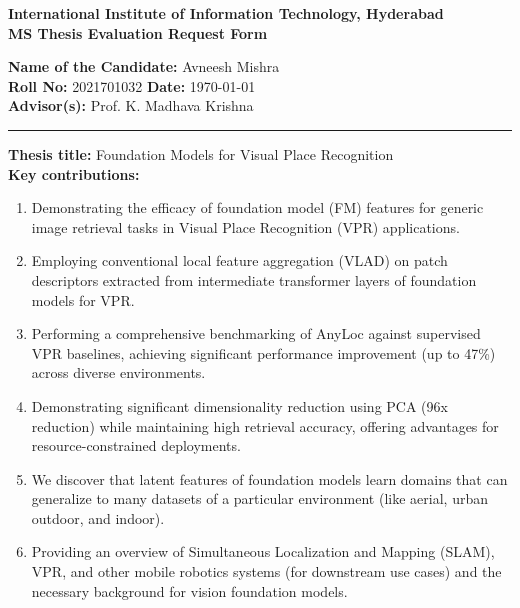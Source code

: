\documentclass[11pt]{article}
\begin{document}
    \begin{center}
        {\Large\bf
        International Institute of Information Technology, Hyderabad
        }\\[2mm]
        {\large\bf
            MS Thesis Evaluation Request Form
        }\\[8mm]
    \end{center}
    {\bf Name of the Candidate:} Avneesh Mishra \\ [2mm]
    {\bf Roll No:} 2021701032
    \hfill {\bf Date:} \today \\ [2mm]
    {\bf Advisor(s):} Prof. K. Madhava Krishna
    \vspace{6mm}
    \hrule
    \vspace{3mm}
    {\bf Thesis title:}
        {Foundation Models for Visual Place Recognition} \\ [4mm]
    {\bf Key contributions:}
    \begin{enumerate}
        \setlength{\itemsep}{0mm}
        \item Demonstrating the efficacy of foundation model (FM)
            features for generic image retrieval tasks in Visual Place
            Recognition (VPR) applications.
        \item Employing conventional local feature aggregation (VLAD)
            on patch descriptors extracted from intermediate
            transformer layers of foundation models for VPR.
        \item Performing a comprehensive benchmarking of AnyLoc
            against supervised VPR baselines, achieving significant
            performance improvement (up to 47\%) across diverse
            environments.
        \item Demonstrating significant dimensionality reduction using
            PCA (96x reduction) while maintaining high retrieval
            accuracy, offering advantages for resource-constrained
            deployments.
        \item We discover that latent features of foundation models
            learn domains that can generalize to many datasets of a
            particular environment (like aerial, urban outdoor, and
            indoor).
        \item Providing an overview of Simultaneous Localization and
            Mapping (SLAM), VPR, and other mobile robotics systems
            (for downstream use cases) and the necessary background
            for vision foundation models.
    \end{enumerate}
\end{document}
